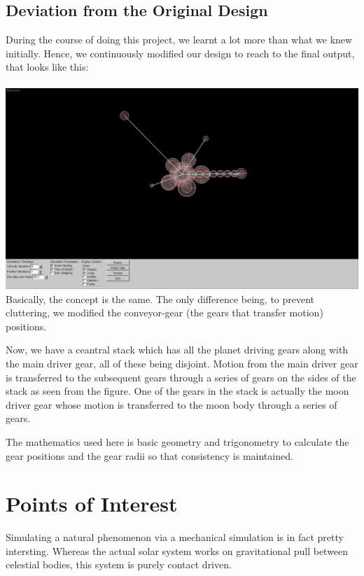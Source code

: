 \documentclass[12pt]{report}
\begin{document}
\pagebreak
\section*{Deviation from the Original Design}
During the course of doing this project, we learnt a lot more than what we knew initially. Hence, we continuously modified our design to reach to the final output, that looks like this:
\\ \\
\includegraphics[scale=0.25]{./img/gui.png}
\\
Basically, the concept is the same. The only difference being, to prevent cluttering, we modified the conveyor-gear (the gears that transfer motion) positions. 

Now, we have a ceantral stack which has all the planet driving gears along with the main driver gear, all of these being disjoint. Motion from the main driver gear is transferred to the subsequent gears through a series of gears on the sides of the stack as seen from the figure. One of the gears in the stack is actually the moon driver gear whose motion is transferred to the moon body through a series of gears.

The mathematics used here is basic geometry and trigonometry to calculate the gear positions and the gear radii so that consistency is maintained.

\pagebreak
\chapter*{Points of Interest}
Simulating a natural phenomenon via a mechanical simulation is in fact pretty intersting. Whereas the actual solar system works on gravitational pull between celestial bodies, this system is purely contact driven. 
\end{document}
